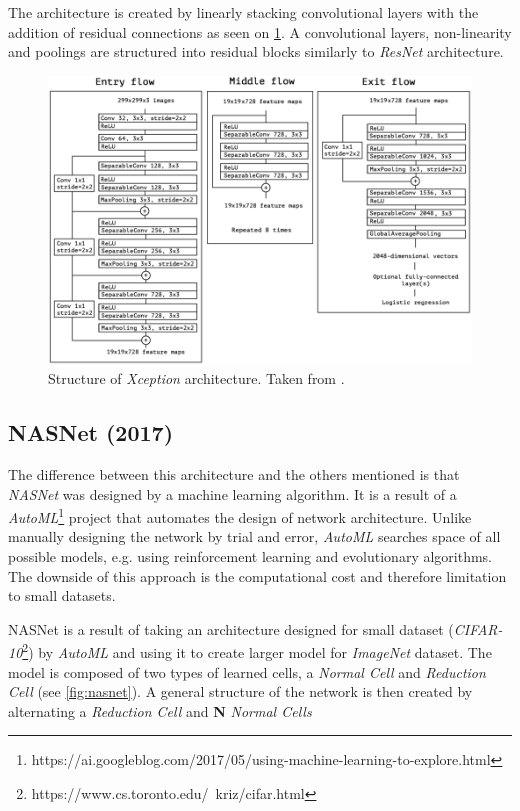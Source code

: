 The architecture is created by linearly stacking convolutional layers with the addition of residual connections as seen on \cref{fig:xception}. A convolutional layers, non-linearity and poolings are structured into residual blocks similarly to \textit{ResNet} architecture.

\begin{figure}
    \includegraphics[width=\textwidth]{img/xception}
    \caption{Structure of \textit{Xception} architecture. Taken from \cite[fig. 5]{bib:xception}.}
    \label{fig:xception}
\end{figure}


\subsection{NASNet (2017)}
\label{sec:nasnet}
The difference between this architecture and the others mentioned is that \textit{NASNet} \cite{bib:nasnet} was designed by a machine learning algorithm. It is a result of a \textit{AutoML}\footnote{https://ai.googleblog.com/2017/05/using-machine-learning-to-explore.html} project that automates the design of network architecture. Unlike manually designing the network by trial and error, \textit{AutoML} searches space of all possible models, e.g. using reinforcement learning and evolutionary algorithms. The downside of this approach is the computational cost and therefore limitation to small datasets.

NASNet is a result of taking an architecture designed for small dataset (\textit{CIFAR-10}\footnote{https://www.cs.toronto.edu/~kriz/cifar.html}) by \textit{AutoML} and using it to create larger model for \textit{ImageNet} dataset. The model is composed of two types of learned cells, a \textit{Normal Cell} and \textit{Reduction Cell} (see \cref{fig:nasnet}). A general structure of the network is then created by alternating a \textit{Reduction Cell} and \textbf{N} \textit{Normal Cells}

